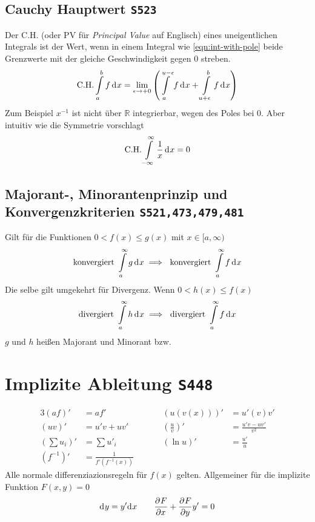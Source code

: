 \documentclass[margin=small, twocolumn]{hsrzf}
\numberwithin{equation}{subsection}
\newcommand{\brpage}[1]{\textcolor{red!70!black}{\small\texttt{S#1}}}
\begin{document}
\subsection{Cauchy Hauptwert \brpage{523}}
Der C.H. (oder PV f\"ur \emph{Principal Value} auf Englisch) eines uneigentlichen Integrals ist der Wert, wenn in einem Integral wie \eqref{eqn:int-with-pole} beide Grenzwerte mit der gleiche Geschwindigkeit gegen 0 streben.
\[
    \text{C.H.} \int\limits_a^b f \,\mathrm{d}^{} x = 
    \lim_{\epsilon\to +0} \left( \int\limits_a^{u-\epsilon} f \,\mathrm{d}^{} x
    + \int\limits_{u+\epsilon}^b f \,\mathrm{d}^{} x \right)
\]
Zum Beispiel \(x^{-1}\) ist nicht \"uber \(\mathbb{R}\) integrierbar, wegen des Poles bei 0. Aber intuitiv wie die Symmetrie vorschlagt
\[
    \text{C.H.} \int\limits^\infty_{-\infty} \frac{1}{x} \,\mathrm{d}^{} x = 0
\]

\subsection{Majorant-, Minorantenprinzip und Konvergenzkriterien \brpage{521,473,479,481}}

Gilt f\"ur die Funktionen \(0 < f(x) \leq g(x)\) mit \(x \in [a,\infty)\)
\[
    \text{konvergiert } \int\limits_a^\infty g \,\mathrm{d}^{} x 
    \implies \text{ konvergiert } \int\limits_a^\infty f \,\mathrm{d}^{} x
\]
Die selbe gilt umgekehrt f\"ur Divergenz. Wenn \(0 < h(x) \leq f(x)\) 
\[
    \text{divergiert } \int\limits_a^\infty h \,\mathrm{d}^{} x 
    \implies \text{ divergiert } \int\limits_a^\infty f \,\mathrm{d}^{} x
\]
\(g\) und \(h\) hei{\ss}en Majorant und Minorant bzw.


\section{Implizite Ableitung \brpage{448}}
\begin{alignat*}{3}
  (af)' &= af' &\quad&& (u(v(x)))' &= u'(v)v' \\
  (uv)' &= u'v + uv' &\quad&& \left(\frac{u}{v}\right)' &= \frac{u'v-uv'}{v^2} \\
  \left(\sum u_i\right)' &= \sum u'_i &\quad&& (\ln u)' &= \frac{u'}{u} \\
  (f^{-1})' &= \frac{1}{f'(f^{-1}(x))}
\end{alignat*}
Alle normale differenziazionsregeln f\"ur \(f(x)\) gelten.
Allgemeiner f\"ur die implizite Funktion \(F(x,y) = 0\)
\[
 	\mathrm{d}^{} y = y'\mathrm{d}^{} x
	\qquad
	\frac{\partial^{} F}{\partial x^{}} + \frac{\partial^{} F}{\partial y^{}} y' = 0
\]
\end{document}
